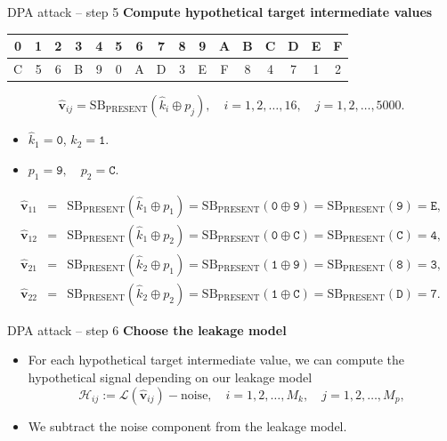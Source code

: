 \begin{frame}{DPA attack -- step 5}
    \textbf{Compute hypothetical target intermediate values}
    \begin{table}[htb]
\centering
\ttfamily
\begin{tabular}{cccccccccccccccc}\hline
 0 & 1 & 2 & 3 & 4 & 5 & 6 & 7 & 8 & 9 & A & B & C & D & E & F \\\hline
 C & 5 & 6 & B & 9 & 0 & A & D & 3 & E & F & 8 & 4 & 7 & 1 & 2\\\hline
\end{tabular}
\end{table}
    \begin{example}
    \[
    \hat{\boldsymbol{v}}_{ij}=\text{SB}_{\text{PRESENT}}(\hat{k}_i\oplus p_j),\quad i=1,2,\dots,16,\quad j=1,2,\dots,5000.
    \]
    \begin{itemize}
    \item $\hat{k}_1=\texttt{0}$, $\hat{k}_2=\texttt{1}$.
    \item $p_1=\texttt{9},\quad p_2=\texttt{C}.$
    \end{itemize}
      \begin{eqnarray*}
        \hat{\boldsymbol{v}}_{11}&=&\text{SB}_{\text{PRESENT}}(\hat{k}_1\oplus p_1)=\text{SB}_{\text{PRESENT}}(\texttt{0}\oplus\texttt{9})=\text{SB}_{\text{PRESENT}}(\texttt{9})=\texttt{E},\\
        \hat{\boldsymbol{v}}_{12}&=&\text{SB}_{\text{PRESENT}}(\hat{k}_1\oplus p_2)=\text{SB}_{\text{PRESENT}}(\texttt{0}\oplus\texttt{C})=\text{SB}_{\text{PRESENT}}(\texttt{C})=\texttt{4},\\
        \hat{\boldsymbol{v}}_{21}&=&\text{SB}_{\text{PRESENT}}(\hat{k}_2\oplus p_1)=\text{SB}_{\text{PRESENT}}(\texttt{1}\oplus\texttt{9})=\text{SB}_{\text{PRESENT}}(\texttt{8})=\texttt{3},\\
         \hat{\boldsymbol{v}}_{22}&=&\text{SB}_{\text{PRESENT}}(\hat{k}_2\oplus p_2)=\text{SB}_{\text{PRESENT}}(\texttt{1}\oplus\texttt{C})=\text{SB}_{\text{PRESENT}}(\texttt{D})=\texttt{7}.
    \end{eqnarray*}
    \end{example}
\end{frame}

\begin{frame}{DPA attack -- step 6}
    \textbf{Choose the leakage model}
    \begin{itemize}
        \item For each hypothetical target intermediate value, we can compute the hypothetical signal depending on our leakage model
    \[
    \mathcal{H}_{ij}:=\mathcal{L}(\hat{\boldsymbol{v}}_{ij})-\text{noise},\quad i=1,2,\dots,M_k,\quad j=1,2,\dots,M_p,
    \]
    \item We subtract the noise component from the leakage model.
    \end{itemize}
\end{frame}

